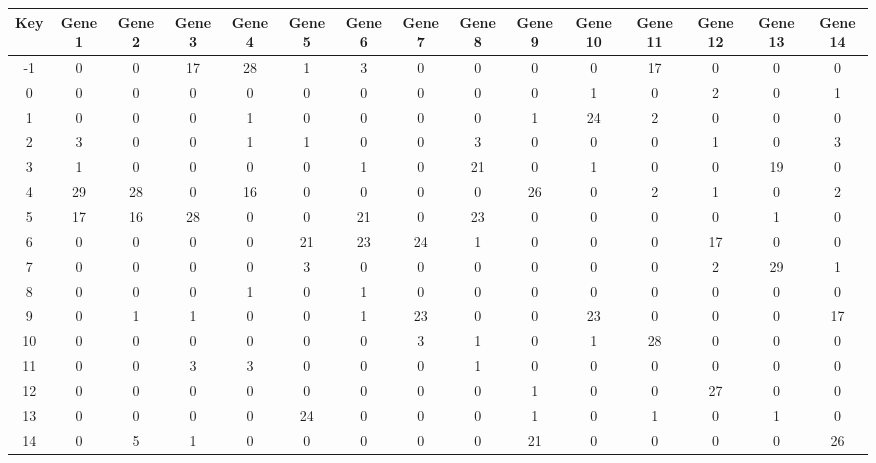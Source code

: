 \begin{tabular}{|c|c|c|c|c|c|c|c|c|c|c|c|c|c|c|}
\hline
Key & Gene 1 & Gene 2 & Gene 3 & Gene 4 & Gene 5 & Gene 6 & Gene 7 & Gene 8 & Gene 9 & Gene 10 & Gene 11 & Gene 12 & Gene 13 & Gene 14 \\
\hline
-1 & 0 & 0 & 17 & 28 & 1 & 3 & 0 & 0 & 0 & 0 & 17 & 0 & 0 & 0 \\
0 & 0 & 0 & 0 & 0 & 0 & 0 & 0 & 0 & 0 & 1 & 0 & 2 & 0 & 1 \\
1 & 0 & 0 & 0 & 1 & 0 & 0 & 0 & 0 & 1 & 24 & 2 & 0 & 0 & 0 \\
2 & 3 & 0 & 0 & 1 & 1 & 0 & 0 & 3 & 0 & 0 & 0 & 1 & 0 & 3 \\
3 & 1 & 0 & 0 & 0 & 0 & 1 & 0 & 21 & 0 & 1 & 0 & 0 & 19 & 0 \\
4 & 29 & 28 & 0 & 16 & 0 & 0 & 0 & 0 & 26 & 0 & 2 & 1 & 0 & 2 \\
5 & 17 & 16 & 28 & 0 & 0 & 21 & 0 & 23 & 0 & 0 & 0 & 0 & 1 & 0 \\
6 & 0 & 0 & 0 & 0 & 21 & 23 & 24 & 1 & 0 & 0 & 0 & 17 & 0 & 0 \\
7 & 0 & 0 & 0 & 0 & 3 & 0 & 0 & 0 & 0 & 0 & 0 & 2 & 29 & 1 \\
8 & 0 & 0 & 0 & 1 & 0 & 1 & 0 & 0 & 0 & 0 & 0 & 0 & 0 & 0 \\
9 & 0 & 1 & 1 & 0 & 0 & 1 & 23 & 0 & 0 & 23 & 0 & 0 & 0 & 17 \\
10 & 0 & 0 & 0 & 0 & 0 & 0 & 3 & 1 & 0 & 1 & 28 & 0 & 0 & 0 \\
11 & 0 & 0 & 3 & 3 & 0 & 0 & 0 & 1 & 0 & 0 & 0 & 0 & 0 & 0 \\
12 & 0 & 0 & 0 & 0 & 0 & 0 & 0 & 0 & 1 & 0 & 0 & 27 & 0 & 0 \\
13 & 0 & 0 & 0 & 0 & 24 & 0 & 0 & 0 & 1 & 0 & 1 & 0 & 1 & 0 \\
14 & 0 & 5 & 1 & 0 & 0 & 0 & 0 & 0 & 21 & 0 & 0 & 0 & 0 & 26 \\
\hline
\end{tabular}